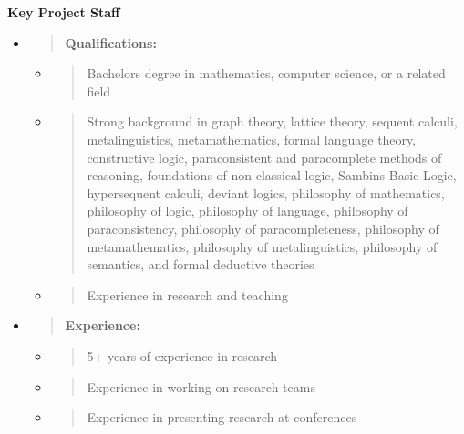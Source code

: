 \textbf{Key Project Staff}

\begin{itemize}
\item
  \begin{quote}
  \textbf{Qualifications:\\
  }
  \end{quote}

  \begin{itemize}
  \item
    \begin{quote}
    Bachelor\textquotesingle s degree in mathematics, computer science,
    or a related field
    \end{quote}
  \item
    \begin{quote}
    Strong background in graph theory, lattice theory, sequent calculi,
    metalinguistics, metamathematics, formal language theory,
    constructive logic, paraconsistent and paracomplete methods of
    reasoning, foundations of non-classical logic,
    Sambin\textquotesingle s Basic Logic, hypersequent calculi, deviant
    logics, philosophy of mathematics, philosophy of logic, philosophy
    of language, philosophy of paraconsistency, philosophy of
    paracompleteness, philosophy of metamathematics, philosophy of
    metalinguistics, philosophy of semantics, and formal deductive
    theories
    \end{quote}
  \item
    \begin{quote}
    Experience in research and teaching
    \end{quote}
  \end{itemize}
\item
  \begin{quote}
  \textbf{Experience:\\
  }
  \end{quote}

  \begin{itemize}
  \item
    \begin{quote}
    5+ years of experience in research
    \end{quote}
  \item
    \begin{quote}
    Experience in working on research teams
    \end{quote}
  \item
    \begin{quote}
    Experience in presenting research at conferences
    \end{quote}
  \end{itemize}
\end{itemize}


